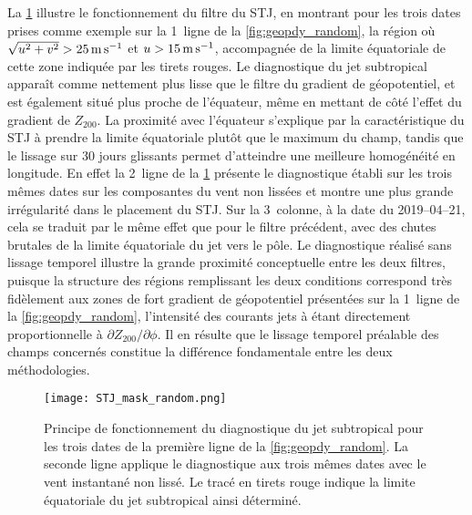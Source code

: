 \documentclass[../main.tex]{subfiles}
\begin{document}
La \cref{fig:STJ_random} illustre le fonctionnement du filtre du STJ, en montrant pour les trois dates prises comme exemple sur la 1\iere~ligne de la
\cref{fig:geopdy_random}, la région où \mbox{$\sqrt{u^2 + v^2} > \SI{25}{\metre\per\second}$} et \mbox{$u > \SI{15}{\metre\per\second}$}, accompagnée de la limite équatoriale de cette zone indiquée
par les tirets rouges. Le diagnostique du jet subtropical apparaît comme nettement plus lisse que le filtre du gradient de géopotentiel, et est également situé
plus proche de l'équateur, même en mettant de côté l'effet  du gradient de $Z_{200}$. La proximité avec l'équateur s'explique par la
caractéristique du STJ à prendre la limite équatoriale plutôt que le maximum du champ, tandis que le lissage sur 30 jours glissants permet d'atteindre une
meilleure homogénéité en longitude. En effet la 2\ieme~ligne de la \cref{fig:STJ_random} présente le diagnostique établi sur les trois mêmes dates sur les
composantes du vent non lissées et montre une plus grande irrégularité dans le placement du STJ. Sur la 3\ieme~colonne, à la date du 2019--04--21, cela se
traduit par le même effet que pour le filtre précédent, avec des chutes brutales de la limite équatoriale du jet vers le pôle. Le diagnostique réalisé sans
lissage temporel illustre la grande proximité conceptuelle entre les deux filtres, puisque la structure des régions remplissant les deux conditions correspond
très fidèlement aux zones de fort gradient de géopotentiel présentées sur la 1\iere~ligne de la \cref{fig:geopdy_random}, l'intensité des courants jets à
 étant directement proportionnelle à $\partial Z_{200} / \partial \phi$. Il en résulte que le lissage temporel préalable des champs concernés constitue
la différence fondamentale entre les deux méthodologies.

\begin{figure}[tb]
    \centering
    \texttt{[image: STJ\_mask\_random.png]}
    \caption{Principe de fonctionnement du diagnostique du jet subtropical pour les trois dates de la première ligne de la \cref{fig:geopdy_random}. La seconde
    ligne applique le diagnostique aux trois mêmes dates avec le vent instantané non lissé. Le tracé en tirets rouge indique la limite équatoriale du jet
    subtropical ainsi déterminé.}
    \label{fig:STJ_random}
\end{figure}
\end{document}
